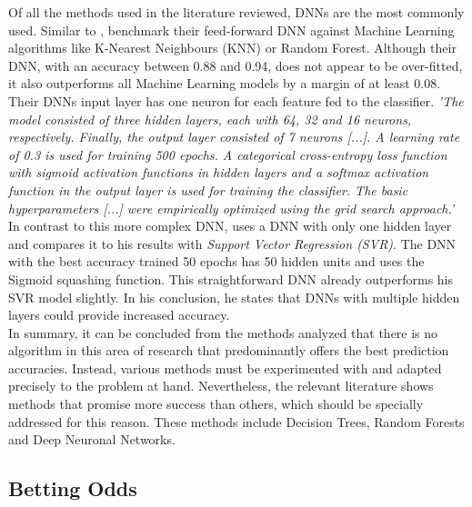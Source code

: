 Of all the methods used in the literature reviewed, DNNs are the most commonly used. Similar to \citet{deng_analysis_2020}, \citet{bhateja_analysis_2021} benchmark their feed-forward DNN against Machine Learning algorithms like K-Nearest Neighbours (KNN) or Random Forest. Although their DNN, with an accuracy between 0.88 and 0.94, does not appear to be over-fitted, it also outperforms all Machine Learning models by a margin of at least 0.08. Their DNNs input layer has one neuron for each feature fed to the classifier. \emph{'The model consisted of three hidden layers, each with 64, 32 and 16 neurons, respectively. Finally, the output layer consisted of 7 neurons [...]. A learning rate of 0.3 is used for training 500 epochs. A categorical cross-entropy loss function with sigmoid activation functions in hidden layers and a softmax activation function in the output layer is used for training the classifier. The basic hyperparameters [...] were empirically optimized using the grid search approach.'} \parencite[, p. 7]{bhateja_analysis_2021} In contrast to this more complex DNN, \citet{lutz_fantasy_2015} uses a DNN with only one hidden layer and compares it to his results with \emph{Support Vector Regression (SVR)}. The DNN with the best accuracy trained 50 epochs has 50 hidden units and uses the Sigmoid squashing function. This straightforward DNN already outperforms his SVR model slightly. In his conclusion, he states that DNNs with multiple hidden layers could provide increased accuracy. \parencite[cf.][, p. 5]{lutz_fantasy_2015} \\
\indent In summary, it can be concluded from the methods analyzed that there is no algorithm in this area of research that predominantly offers the best prediction accuracies. Instead, various methods must be experimented with and adapted precisely to the problem at hand. Nevertheless, the relevant literature shows methods that promise more success than others, which should be specially addressed for this reason. These methods include Decision Trees, Random Forests and Deep Neuronal Networks.

\clearpage \subsection{Betting Odds}

